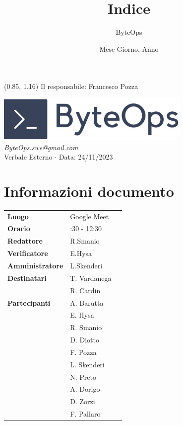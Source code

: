\documentclass{article}
\title{\textbf{\fontsize{28}{6}\selectfont Indice}}
\author{\fontsize{14}{6}\selectfont ByteOps}
\date{Mese Giorno, Anno}
\begin{document}
\begin{textblock*}{\textwidth}(0.85\textwidth, 1.16\textheight)
    Il responsabile: Francesco Pozza
\end{textblock*}

\pagestyle{fancy}
\begin{center}
\includegraphics[width = 0.7\textwidth]{../../../Images/logo.png} \\
\vspace{0.2cm}
\textcolor[RGB]{60, 60, 60}{\textit{ByteOps.swe@gmail.com}} \\
\vspace{1cm}
\fontsize{16}{6}\selectfont Verbale Esterno $\cdot$ Data: 24/11/2023 \\
\vspace{0.5cm}
\end{center}

\section*{Informazioni documento}
\def\arraystretch{1.2}
\begin{tabular}{>{\raggedleft\arraybackslash}p{}|>{\raggedright\arraybackslash}p{}c}
\hline
\addlinespace
\textbf{Luogo} & Google Meet \vspace{10pt} \\
\textbf{Orario} & 11:30 - 12:30 \vspace{10pt} \\
\textbf{Redattore} & R.Smanio \vspace{10pt} \\
\textbf{Verificatore} & E.Hysa \vspace{10pt} \\
\textbf{Amministratore} & L.Skenderi \vspace{10pt} \\
\textbf{Destinatari} & T. Vardanega \\ & R. Cardin \vspace{10pt} \\
\textbf{Partecipanti} & A. Barutta \\ & E. Hysa \\ & R. Smanio \\ & D. Diotto \\ & F. Pozza \\ & L. Skenderi \\ & N. Preto \\ & A. Dorigo \\ & D. Zorzi \\ & F. Pallaro \vspace{10pt} \\
\end{tabular}
\pagebreak 
\end{document}
